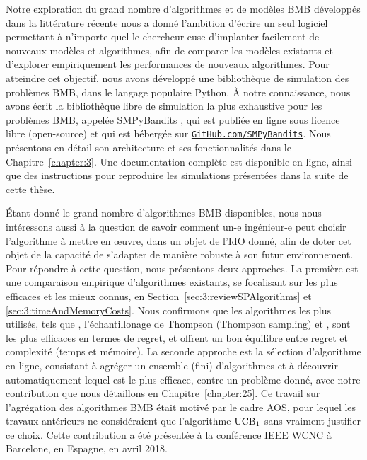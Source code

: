 \begin{resume_fr}
%
Notre exploration du grand nombre d'algorithmes et de modèles BMB développés dans la littérature récente
nous a donné l'ambition d'écrire un seul logiciel permettant à n'importe quel-le chercheur-euse d'implanter facilement de nouveaux modèles et algorithmes, afin de comparer les modèles existants et d'explorer empiriquement les performances de nouveaux algorithmes.
Pour atteindre cet objectif, nous avons développé une bibliothèque de simulation des problèmes BMB, dans le langage populaire Python.
%
À notre connaissance, nous avons écrit la bibliothèque libre de simulation la plus exhaustive pour les problèmes BMB, appelée SMPyBandits \cite{SMPyBanditsJMLR,SMPyBandits}, qui est publiée en ligne sous licence libre (open-source) et qui est hébergée sur \href{https://GitHub.com/SMPyBandits}{\texttt{GitHub.com/SMPyBandits}}.
Nous présentons en détail son architecture et ses fonctionnalités dans le Chapitre~\ref{chapter:3}.
Une documentation complète est disponible en ligne, ainsi que des instructions pour reproduire les simulations présentées dans la suite de cette thèse.


%
Étant donné le grand nombre d'algorithmes BMB disponibles, nous nous intéressons aussi à la question de savoir comment un-e ingénieur-e peut choisir l'algorithme à mettre en œuvre, dans un objet de l'IdO donné, afin de doter cet objet de la capacité de s'adapter de manière robuste à son futur environnement.
Pour répondre à cette question, nous présentons deux approches.
La première est une comparaison empirique d'algorithmes existants, se focalisant sur les plus efficaces et les mieux connus, en Section~\ref{sec:3:reviewSPAlgorithms} et \ref{sec:3:timeAndMemoryCosts}.
Nous confirmons que les algorithmes les plus utilisés, tels que \UCB{} \cite{Auer02}, l'échantillonage de Thompson (Thompson sampling) \cite{Thompson33} et \klUCB{} \cite{KLUCBJournal}, sont les plus efficaces en termes de regret, et offrent un bon équilibre entre regret et complexité (temps et mémoire).
La seconde approche est la sélection d'algorithme en ligne, consistant à agréger un ensemble (fini) d'algorithmes et à découvrir automatiquement lequel est le plus efficace, contre un problème donné, avec notre contribution \Aggr{} que nous détaillons en Chapitre~\ref{chapter:25}.
Ce travail sur l'agrégation des algorithmes BMB était motivé par le cadre AOS, pour lequel les travaux antérieurs ne considéraient que l'algorithme $\mathrm{UCB}_1$ sans vraiment justifier ce choix.
Cette contribution a été présentée à la conférence IEEE WCNC à Barcelone, en Espagne, en avril 2018.



\end{resume_fr}
